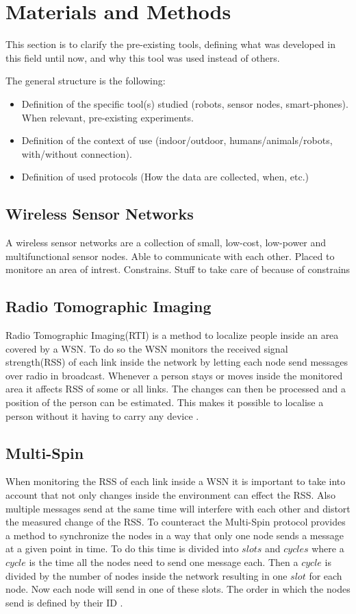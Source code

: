 \chapter{Materials and Methods}

This section is to clarify the pre-existing tools, defining what was developed in this field until now, and why this tool was used instead of others.

The general structure is the following:
\begin{itemize}
	\item Definition of the specific tool(s) studied (robots, sensor nodes, smart-phones). When relevant, pre-existing experiments.
	\item Definition of the context of use (indoor/outdoor, humans/animals/robots, with/without connection).
	\item Definition of used protocols (How the data are collected, when, etc.)
\end{itemize}

\section{Wireless Sensor Networks}
A wireless sensor networks are a collection of small, low-cost, low-power and multifunctional sensor nodes.
Able to communicate with each other. 
Placed to monitore an area of intrest.
Constrains.
Stuff to take care of because of constrains
\section{Radio Tomographic Imaging}
Radio Tomographic Imaging(RTI) is a method to localize people inside an area covered by a WSN. To do so the WSN monitors the received signal strength(RSS) of each link inside the network by letting each node send messages over radio in broadcast. Whenever a person stays or moves inside the monitored area it affects RSS of some or all links. The changes can then be processed and a position of the person can be estimated. This makes it possible to localise a person without it having to carry any device \cite{RtiMulti}.
\section{Multi-Spin}
When monitoring the RSS of each link inside a WSN it is important to take into account that not only changes inside the environment can effect the RSS. Also multiple messages send at the same time will interfere with each other and distort the measured change of the RSS. To counteract the Multi-Spin protocol provides a method to synchronize the nodes in a way that only one node sends a message at a given point in time. 
To do this time is divided into $slots$ and $cycles$ where a $cycle$ is the time all the nodes need to send one message each. Then a $cycle$ is divided by the number of nodes inside the network resulting in one $slot$ for each node. Now each node will send in one of these slots. The order in which the nodes send is defined by their ID \cite{RtiMulti}.

